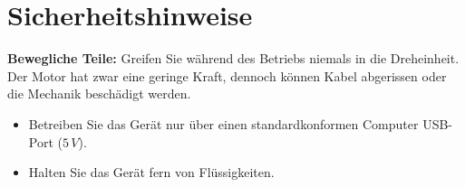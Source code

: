 %
%

\chapter{Sicherheitshinweise}

	\textbf{Bewegliche Teile:} Greifen Sie während des Betriebs niemals in die Dreheinheit. Der Motor hat zwar eine geringe Kraft, dennoch können Kabel abgerissen oder die Mechanik beschädigt werden.

\begin{itemize}
	\item Betreiben Sie das Gerät nur über einen standardkonformen Computer USB-Port ($5\,V$).
	\item Halten Sie das Gerät fern von Flüssigkeiten.
\end{itemize}





